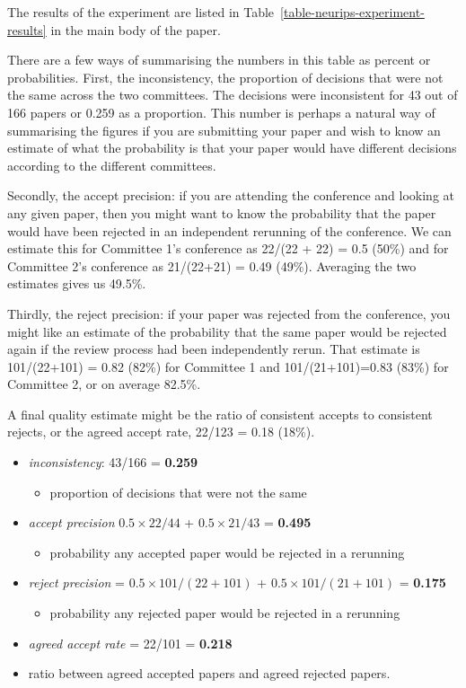 The results of the experiment are listed in Table~\ref{table-neurips-experiment-results} in the main body of the paper.

There are a few ways of summarising the numbers in this table as percent
or probabilities. First, the inconsistency, the proportion of decisions
that were not the same across the two committees. The decisions were
inconsistent for 43 out of 166 papers or 0.259 as a proportion. This
number is perhaps a natural way of summarising the figures if you are
submitting your paper and wish to know an estimate of what the
probability is that your paper would have different decisions according
to the different committees. 

Secondly, the accept precision: if you are
attending the conference and looking at any given paper, then you might
want to know the probability that the paper would have been rejected in
an independent rerunning of the conference. We can estimate this for
Committee 1's conference as 22/(22 + 22) = 0.5 (50\%) and for Committee
2's conference as 21/(22+21) = 0.49 (49\%). Averaging the two estimates
gives us 49.5\%. 

Thirdly, the reject precision: if your paper was
rejected from the conference, you might like an estimate of the
probability that the same paper would be rejected again if the review
process had been independently rerun. That estimate is 101/(22+101) =
0.82 (82\%) for Committee 1 and 101/(21+101)=0.83 (83\%) for Committee
2, or on average 82.5\%. 

A final quality estimate might be the ratio of
consistent accepts to consistent rejects, or the agreed accept rate,
22/123 = 0.18 (18\%).

\begin{itemize}
\tightlist
\item
  \emph{inconsistency}: 43/166 = \textbf{0.259}

  \begin{itemize}
  \tightlist
  \item
    proportion of decisions that were not the same
  \end{itemize}
\item
  \emph{accept precision} \(0.5 \times 22/44\) + \(0.5 \times 21/43\) =
  \textbf{0.495}

  \begin{itemize}
  \tightlist
  \item
    probability any accepted paper would be rejected in a rerunning
  \end{itemize}
\item
  \emph{reject precision} = \(0.5\times 101/(22+101)\) +
  \(0.5\times 101/(21 + 101)\) = \textbf{0.175}

  \begin{itemize}
  \tightlist
  \item
    probability any rejected paper would be rejected in a rerunning
  \end{itemize}
\item
  \emph{agreed accept rate} = 22/101 = \textbf{0.218}
\item
  ratio between agreed accepted papers and agreed rejected papers.
\end{itemize}

